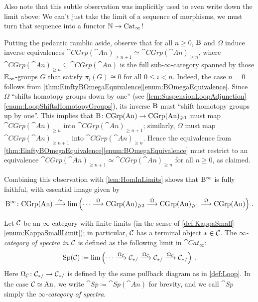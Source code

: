 \begin{con}
	Also note that this subtle observation was implicitly used to even write down the limit above: We can't just take the limit of a sequence of morphisms, we must turn that sequence into a functor $\mathbb{N}\rightarrow \mathrm{Cat}_\infty$!
	
	Putting the pedantic ramblic aside, observe that for all $n\geqslant 0$, $\mathrm{B}$ and $\Omega$ induce inverse equivalences $\cat{CGrp}(\cat{An})_{\geqslant n+1}\simeq \cat{CGrp}(\cat{An})_{\geqslant n}$, where $\cat{CGrp}(\cat{An})_{\geqslant n}\subseteq \cat{CGrp}(\cat{An})$ is the full sub-$\infty$-category spanned by those $\mathbb{E}_\infty$-groups $G$ that satisfy $\pi_i(G)\cong0$ for all $0\leqslant i<n$. Indeed, the case $n=0$ follows from \cref{thm:EinftyBOmegaEquivalence}\cref{enum:BOmegaEquivalence}. Since $\Omega$ \enquote{shifts homotopy groups down by one} (see \cref{lem:SuspensionLoopAdjunction}\cref{enum:LoopShiftsHomotopyGroups}), its inverse $\mathrm{B}$ must \enquote{shift homotopy groups up by one}. This implies that $\mathrm{B}\colon \mathrm{CGrp}(\mathrm{An})\rightarrow \mathrm{CGrp}(\mathrm{An})_{\geqslant 1}$ must map $\cat{CGrp}(\cat{An})_{\geqslant n}$ into $\cat{CGrp}(\cat{An})_{\geqslant n+1}$; similarly, $\Omega$ must map $\cat{CGrp}(\cat{An})_{\geqslant n+1}$ into $\cat{CGrp}(\cat{An})_{\geqslant n}$. Hence the equivalence from \cref{thm:EinftyBOmegaEquivalence}\cref{enum:BOmegaEquivalence} must restrict to an equivalence $\cat{CGrp}(\cat{An})_{\geqslant n+1}\simeq \cat{CGrp}(\cat{An})_{\geqslant n}$ for all $n\geqslant 0$, as claimed.
	
	Combining this observation with \cref{lem:HomInLimits} shows that $\mathrm{B}^\infty$ is fully faithful, with essential image given by
	\begin{equation*}
		\mathrm{B}^\infty\colon \mathrm{CGrp}(\mathrm{An})\overset{\simeq}{\longrightarrow}\operatorname*{lim}\left(\dotsb\overset{\Omega}{\longrightarrow} \mathrm{CGrp}(\mathrm{An})_{\geqslant 2}\overset{\Omega}{\longrightarrow} \mathrm{CGrp}(\mathrm{An})_{\geqslant 1}\overset{\Omega}{\longrightarrow} \mathrm{CGrp}(\mathrm{An})\right)\,.
	\end{equation*}
\end{con}
\begin{defi}\label{def:Spectra}
	Let $\mathcal{C}$ be an $\infty$-category with finite limits (in the sense of \cref{def:KappaSmall}\cref{enum:KappaSmallLimit}); in particular, $\mathcal{C}$ has a terminal object $*\in\mathcal{C}$. The \emph{$\infty$-category of spectra in $\mathcal{C}$} is defined as the following limit in $\cat{Cat}_\infty$:
	\begin{equation*}
		\mathrm{Sp}(\mathcal{C})\coloneqq \operatorname*{lim}\left(\dotsb\overset{\Omega_{\mathcal{C}}}{\longrightarrow} \mathcal{C}_{*/}\overset{\Omega_{\mathcal{C}}}{\longrightarrow} \mathcal{C}_{*/}\overset{\Omega_{\mathcal{C}}}{\longrightarrow} \mathcal{C}_{*/}\right)\,.
	\end{equation*}
	Here $\Omega_{\mathcal{C}}\colon \mathcal{C}_{*/}\rightarrow \mathcal{C}_{*/}$ is defined by the same pullback diagram as in \cref{def:Loop}. In the case $\mathcal{C}\simeq \mathrm{An}$, we write $\cat{Sp}\coloneqq \cat{Sp}(\cat{An})$ for brevity, and we call $\cat{Sp}$ simply the \emph{$\infty$-category of spectra}.
\end{defi}
